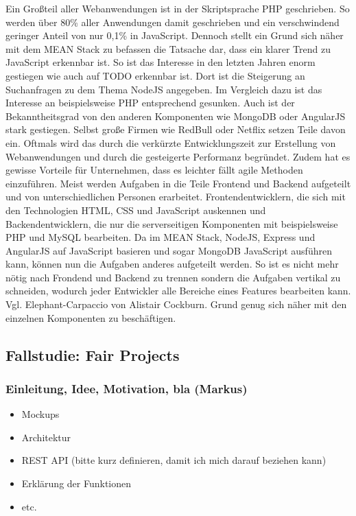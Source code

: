 \documentclass[]{article}
\begin{document}
Ein Großteil aller Webanwendungen ist in der Skriptsprache PHP
geschrieben. So werden über 80\% aller Anwendungen damit geschrieben und
ein verschwindend geringer Anteil von nur 0,1\% in JavaScript. Dennoch
stellt ein Grund sich näher mit dem MEAN Stack zu befassen die Tatsache
dar, dass ein klarer Trend zu JavaScript erkennbar ist. So ist das
Interesse in den letzten Jahren enorm gestiegen wie auch auf TODO
erkennbar ist. Dort ist die Steigerung an Suchanfragen zu dem Thema
NodeJS angegeben. Im Vergleich dazu ist das Interesse an beispielsweise
PHP entsprechend gesunken. Auch ist der Bekanntheitsgrad von den anderen
Komponenten wie MongoDB oder AngularJS stark gestiegen. Selbst große
Firmen wie RedBull oder Netflix setzen Teile davon ein. Oftmals wird das
durch die verkürzte Entwicklungszeit zur Erstellung von Webanwendungen
und durch die gesteigerte Performanz begründet. Zudem hat es gewisse
Vorteile für Unternehmen, dass es leichter fällt agile Methoden
einzuführen. Meist werden Aufgaben in die Teile Frontend und Backend
aufgeteilt und von unterschiedlichen Personen erarbeitet.
Frontendentwicklern, die sich mit den Technologien HTML, CSS und
JavaScript auskennen und Backendentwicklern, die nur die serverseitigen
Komponenten mit beispielsweise PHP und MySQL bearbeiten. Da im MEAN
Stack, NodeJS, Express und AngularJS auf JavaScript basieren und sogar
MongoDB JavaScript ausführen kann, können nun die Aufgaben anderes
aufgeteilt werden. So ist es nicht mehr nötig nach Frondend und Backend
zu trennen sondern die Aufgaben vertikal zu schneiden, wodurch jeder
Entwickler alle Bereiche eines Features bearbeiten kann. Vgl.
Elephant-Carpaccio von Alistair Cockburn. Grund genug sich näher mit den
einzelnen Komponenten zu beschäftigen.

\subsection{Fallstudie: Fair Projects}\label{fallstudie-fair-projects}

\subsubsection{Einleitung, Idee, Motivation, bla
(Markus)}\label{einleitung-idee-motivation-bla-markus}

\begin{itemize}
\itemsep1pt\parskip0pt
\item
  Mockups
\item
  Architektur
\item
  REST API (bitte kurz definieren, damit ich mich darauf beziehen kann)
\item
  Erklärung der Funktionen
\item
  etc.
\end{itemize}
\end{document}
